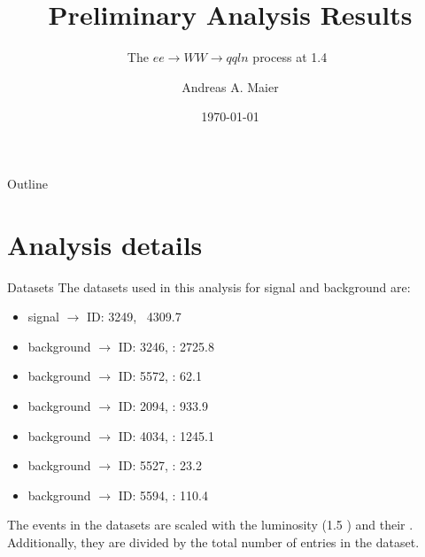 \documentclass{beamer}
\title{Preliminary Analysis Results}
\subtitle{The $ee \rightarrow WW \rightarrow qqln$ process at 1.4~\TeV}
\author{Andreas A. Maier\inst{1}}
\institute[CERN] %
{
  \inst{1}%
  CERN
}
\date{\today}
\begin{document}
\begin{frame}
  \titlepage
\end{frame}






























\begin{frame}{Outline}
  \begin{multicols}{2}
    \tableofcontents
  \end{multicols}
\end{frame}









\section{Analysis details}

\begin{frame}{Datasets}
The datasets used in this analysis for signal and background are:
\begin{itemize}
\item signal \qqln $\rightarrow$ ID: 3249, \xsec\ 4309.7~\fb
\item background \qqll $\rightarrow$ ID: 3246, \xsec: 2725.8~\fb
\item background \qqqqll $\rightarrow$ ID: 5572, \xsec: 62.1~\fb
\item background \qqnn $\rightarrow$ ID: 2094, \xsec: 933.9~\fb
\item background \qqqq $\rightarrow$ ID: 4034, \xsec: 1245.1~\fb
\item background \qqqqnn $\rightarrow$ ID: 5527, \xsec: 23.2~\fb
\item background \qqqqln $\rightarrow$ ID: 5594, \xsec: 110.4~\fb
\end{itemize}
The events in the datasets are scaled with the luminosity (1.5 \invab) and their \xsec.
%
Additionally, they are divided by the total number of entries in the dataset.
\end{frame}
\end{document}
